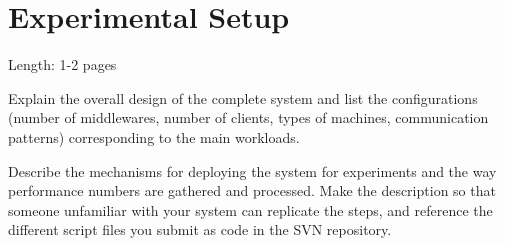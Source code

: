 \documentclass[11pt]{article}
\begin{document}
\section{Experimental Setup}\label{sec:experimental-setup}

Length: 1-2 pages

Explain the overall design of the complete system and list the
configurations (number of middlewares, number of clients, types of
machines, communication patterns) corresponding to the main workloads.

Describe the mechanisms for deploying the system for experiments and the
way performance numbers are gathered and processed. Make the description
so that someone unfamiliar with your system can replicate the steps, and
reference the different script files you submit as code in the SVN
repository.
\end{document}
